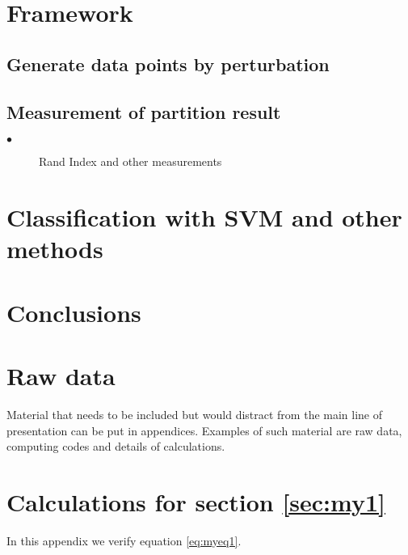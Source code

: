 \documentclass{uonmathreport}
\begin{document}
\section{Framework} \label{sec:framework}

\subsection{Generate data points by perturbation} \label{subsec:blue}

\subsection{Measurement of partition result} \label{subsubsec:red}

\begin{description}
  \item[$\bullet$] Rand Index and other measurements
\end{description}



\section{Classification with SVM and other methods} \label{sec:Classification}



\section{Conclusions} \label{sec:conclusions}



\newpage

\appendix

\section{Raw data} \label{app:rawdata}

Material that needs to be included but would distract from the main
line of presentation can be put in appendices.
Examples of such material are raw
data, computing codes and details of calculations.


\section{Calculations for section \ref{sec:my1}} \label{app:calculations}

In this appendix we verify equation \eqref{eq:myeq1}.

\newpage



\end{document}
